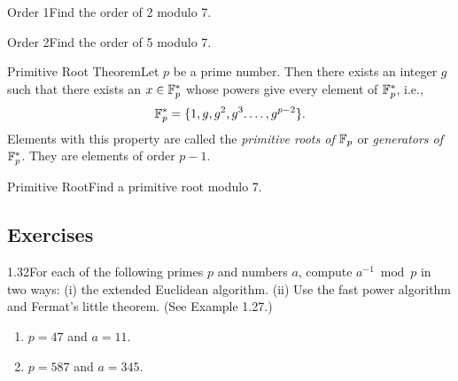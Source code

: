 \begin{example}
    {Order 1}Find the order of 2 modulo 7.
\end{example}


\begin{example}
    {Order 2}Find the order of 5 modulo 7.
\end{example}


\begin{theorem}
    {Primitive Root Theorem}Let \(p\) be a prime number. Then there exists an integer \(g\) such that there exists an \(x \in \mathbb{F}_p^*\) whose powers give every element of \(\mathbb{F}_p^*\), i.e., \[\mathbb{F}_p^* = \{1,g,g^2,g^3.\dots,g^{p - 2}\}.\] Elements with this property are called the \textit{primitive roots of} \(\mathbb{F}_p\) or \textit{generators of} \(\mathbb{F}_p^*\). They are elements of order \(p - 1\).
\end{theorem}

\begin{example}
    {Primitive Root}Find a primitive root modulo 7.
\end{example}


\renewcommand{\theenumi}{\alph{enumi}}
\renewcommand{\labelenumi}{(\theenumi)}
\subsection{Exercises}

\begin{exercise}
    {1.32}For each of the following primes \( p \) and numbers \( a \), compute \( a^{-1} \bmod p \) in two ways: (i) the extended Euclidean algorithm. (ii) Use the fast power algorithm and Fermat's little theorem. (See Example 1.27.)
    \begin{enumerate}
        \item \( p = 47 \) and \( a = 11 \).
        \item \( p = 587 \) and \( a = 345 \).
    \end{enumerate}
\end{exercise}

